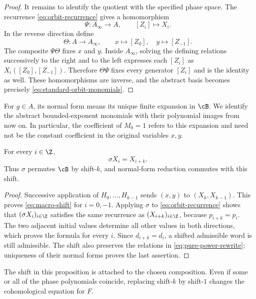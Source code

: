 \begin{proof}
It remains to identify the quotient with the specified phase space.
The recurrence \eqref{eq:orbit-recurrence} gives a homomorphism
\[
  \Psi:A_\infty\longrightarrow A,\qquad [Z_i]\longmapsto X_i.
\]
In the reverse direction define
\[
  \Theta:A\longrightarrow A_\infty,\qquad
  x\longmapsto[Z_0],\quad y\longmapsto[Z_{-1}].
\]
The composite $\Psi\Theta$ fixes $x$ and $y$.
Inside $A_\infty$, solving the defining relations successively to the
right and to the left expresses each $[Z_i]$ as
$X_i([Z_0],[Z_{-1}])$.  Therefore $\Theta\Psi$ fixes every generator
$[Z_i]$ and is the identity as well.  These homomorphisms are inverse,
and the abstract basis becomes precisely \eqref{eq:standard-orbit-monomials}.
\end{proof}

For $g\in A$, its normal form means its unique finite expansion in $\cB$.
We identify the abstract bounded-exponent monomials with their polynomial
images from now on.  In particular, the coefficient of $M_0=1$ refers to
this expansion and need not be the constant coefficient in the original
variables $x,y$.

\begin{proposition}
\label{prop:macro-shift}
For every $i\in\Z$,
\begin{equation}
  \sigma X_i=X_{i+k}.
  \label{eq:macro-shift}
\end{equation}
Thus $\sigma$ permutes $\cB$ by shift-$k$, and normal-form reduction
commutes with this shift.
\end{proposition}

\begin{proof}
Successive application of $H_0,\ldots,H_{k-1}$ sends $(x,y)$ to
$(X_k,X_{k-1})$.  This proves \eqref{eq:macro-shift} for $i=0,-1$.
Applying $\sigma$ to \eqref{eq:orbit-recurrence} shows that
$(\sigma X_i)_{i\in\Z}$ satisfies the same recurrence as
$(X_{i+k})_{i\in\Z}$, because $p_{i+k}=p_i$.
The two adjacent initial values determine all other values in both
directions, which proves the formula for every $i$.
Since $d_{i+k}=d_i$, a shifted admissible word is still admissible.
The shift also preserves the relations in
\eqref{eq:pure-power-rewrite}; uniqueness of their normal forms proves
the last assertion.
\end{proof}

The shift in this proposition is attached to the chosen composition.
Even if some or all of the phase polynomials coincide, replacing
shift-$k$ by shift-$1$ changes the cohomological equation for $F$.


